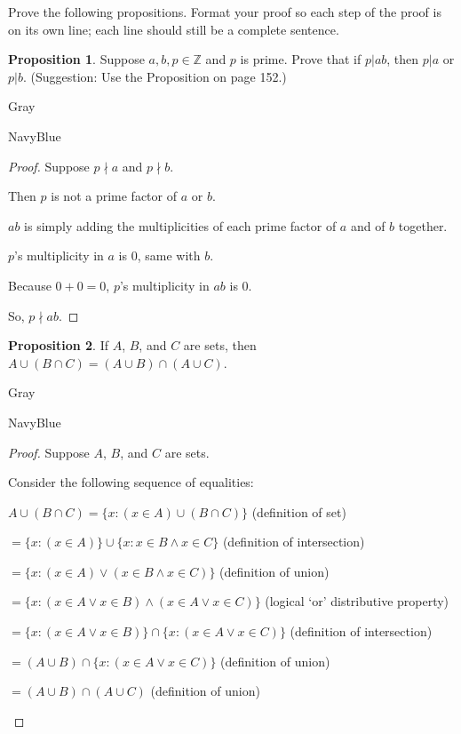 \documentclass[12pt]{amsart}
\theoremstyle{named}
\newenvironment{prf}
{\medskip\begin{color}{Gray}\begin{framed}\begin{color}{NavyBlue}\begin{proof}[Proof]
\doublespacing}
{\end{proof}\end{color}\end{framed}\end{color}\medskip}
\theoremstyle{definition}
\newtheorem{proposition}{Proposition}
\newcommand{\Z}{\mathbb Z}
\begin{document}
Prove the following propositions. Format your proof so each step of the proof is on its own line; each line should still be a complete sentence.

\begin{proposition}
	Suppose $a,b,p\in\Z$ and $p$ is prime.
	Prove that if $p|ab$, then $p|a$ or $p|b$.
	(Suggestion: Use the Proposition on page 152.)
\end{proposition}

\begin{prf}
	\phantom{ }

	Suppose $p\nmid a$ and $p \nmid b$.

	Then $p$ is not a prime factor of $a$ or $b$.

	$ab$ is simply adding the multiplicities of each prime factor
	of $a$ and of $b$ together. 
	
	$p$'s multiplicity in $a$ is $0$, same with $b$. 
	
	Because $0 + 0 = 0$, $p$'s multiplicity in $ab$ is $0$.

	So, $p \nmid ab$. 
\end{prf}

\begin{proposition}
	If $A$, $B$, and $C$ are sets, then $A\cup(B\cap C) = (A\cup B)\cap(A\cup C)$.
	
\end{proposition}

\begin{prf}
	\phantom{ }

	Suppose $A$, $B$, and $C$ are sets.

	Consider the following sequence of equalities:

	\begin{adjustwidth}{2em}{0em}
		$A \cup (B \cap C) = \{x : (x \in A) \cup (B \cap C)\}$ \hfill (definition of set)

		$=\{x : (x \in A)\} \cup \{x: x \in B \land x \in C\}$ \hfill (definition of intersection)

		$=\{x : (x \in A) \lor (x \in B \land x \in C)\}$ \hfill (definition of union)

		$=\{x : (x \in A \lor x \in B) \land (x \in A \lor x \in C)\}$ \hfill (logical `or' distributive property)
	
		$=\{x : (x \in A \lor x \in B)\} \cap \{x: (x \in A \lor x \in C)\}$ \hfill (definition of intersection)
		
		$=(A \cup B) \cap \{x: (x \in A \lor x \in C)\}$ \hfill (definition of union)

		$=(A \cup B) \cap (A \cup C)$ \hfill (definition of union)
	
	\end{adjustwidth}

\end{prf}
\end{document}
